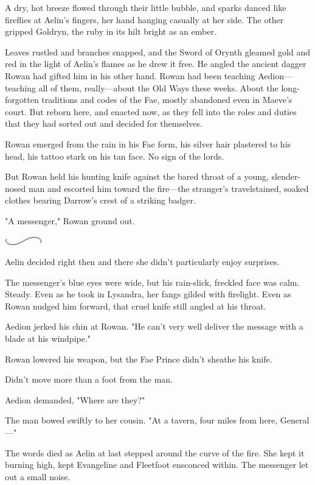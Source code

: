 A dry, hot breeze flowed through their little bubble, and sparks danced like fireflies at Aelin's fingers, her hand hanging casually at her side.
The other gripped Goldryn, the ruby in its hilt bright as an ember.

Leaves rustled and branches snapped, and the Sword of Orynth gleamed gold and red in the light of Aelin's flames as he drew it free.
He angled the ancient dagger Rowan had gifted him in his other hand.
Rowan had been teaching Aedion---teaching all of them, really---about the Old Ways these weeks.
About the long-forgotten traditions and codes of the Fae, mostly abandoned even in Maeve's court.
But reborn here, and enacted now, as they fell into the roles and duties that they had sorted out and decided for themselves.

Rowan emerged from the rain in his Fae form, his silver hair plastered to his head, his tattoo stark on his tan face.
No sign of the lords.

But Rowan held his hunting knife against the bared throat of a young,
slender-nosed man and escorted him toward the fire---the stranger's travelstained, soaked clothes bearing Darrow's crest of a striking badger.

"A messenger," Rowan ground out.

\begin{center}
    \includegraphics[width=0.65in,height=0.13in]{images/seperator}
\end{center}

Aelin decided right then and there she didn't particularly enjoy surprises.

The messenger's blue eyes were wide, but his rain-slick, freckled face was calm.
Steady.
Even as he took in Lysandra, her fangs gilded with firelight.
Even as Rowan nudged him forward, that cruel knife still angled at his throat.

Aedion jerked his chin at Rowan.
"He can't very well deliver the message with a blade at his windpipe."

Rowan lowered his weapon, but the Fae Prince didn't sheathe his knife.

Didn't move more than a foot from the man.

Aedion demanded, "Where are they?"

The man bowed swiftly to her cousin.
"At a tavern, four miles from here, General---"

The words died as Aelin at last stepped around the curve of the fire.
She kept it burning high, kept Evangeline and Fleetfoot ensconced within.
The messenger let out a small noise.

